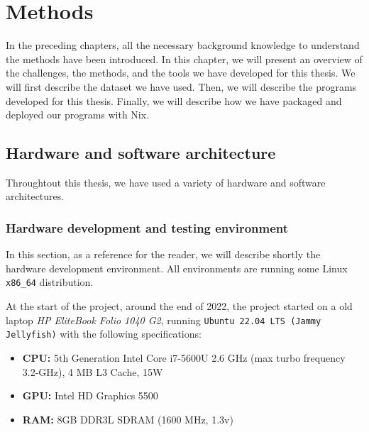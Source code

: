 \chapter{Methods}\label{chap:methods}


In the preceding chapters, all the necessary background knowledge to understand the methods have been introduced. In this chapter, we will present an overview of the challenges, the methods, and the tools we have developed for this thesis. We will first describe the dataset we have used. Then, we will describe the programs developed for this thesis. Finally, we will describe how we have packaged and deployed our programs with Nix.



\section{Hardware and software architecture}
    Throughtout this thesis, we have used a variety of hardware and software architectures. 
    
    \subsection{Hardware development and testing environment}
    In this section, as a reference for the reader, we will describe shortly the hardware development environment. All environments are running some Linux \texttt{x86\_64} distribution.

    At the start of the project, around the end of 2022, the project started on a old laptop \textit{HP EliteBook Folio 1040 G2}, running \texttt{Ubuntu 22.04 LTS (Jammy Jellyfish)} with the following specifications:

    \begin{itemize}
        \item \textbf{CPU:} 5th Generation Intel Core i7-5600U 2.6 GHz (max turbo frequency 3.2-GHz), 4 MB L3 Cache, 15W
        \item \textbf{GPU:} Intel HD Graphics 5500
        \item \textbf{RAM:} 8GB DDR3L SDRAM (1600 MHz, 1.3v)
    \end{itemize}

